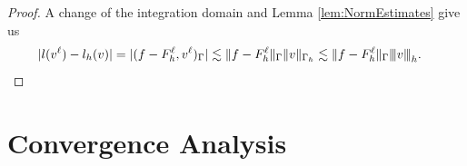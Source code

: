 \documentclass[10pt, a4paper]{amsart}
\theoremstyle{definition}
\theoremstyle{remark}
\theoremstyle{example}
\numberwithin{equation}{section}
\newcommand{\tbar}[1]{{\left\vert\kern-0.25ex\left\vert\kern-0.25ex\left\vert #1 
    \right\vert\kern-0.25ex\right\vert\kern-0.25ex\right\vert}}
\begin{document}
\begin{proof}
A change of the integration domain and Lemma \ref{lem:NormEstimates}
give us
\begin{align*}
|l(v^\ell) - l_h(v)|
& = |(f-F^\ell_h, v^\ell)_\Gamma| \lesssim \|f-F^{\ell}_h\|_\Gamma \|v\|_{\Gamma_h}
\lesssim  \|f-F^{\ell}_h\|_\Gamma\tbar{v}_{h}.
\end{align*}
\end{proof}


\section{Convergence Analysis}\label{sec-converge}
\end{document}

